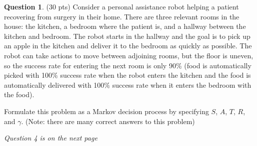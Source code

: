 \documentclass{article}
\theoremstyle{definition}
\newtheorem{question}[thm]{Question}
\begin{document}
\begin{question} (30 pts)
    Consider a personal assistance robot helping a patient recovering from surgery in their home. There are three relevant rooms in the house: the kitchen, a bedroom where the patient is, and a hallway between the kitchen and bedroom. The robot starts in the hallway and the goal is to pick up an apple in the kitchen and deliver it to the bedroom as quickly as possible. The robot can take actions to move between adjoining rooms, but the floor is uneven, so the success rate for entering the next room is only 90\% (food is automatically picked with 100\% success rate when the robot enters the kitchen and the food is automatically delivered with 100\% success rate when it enters the bedroom with the food).

    Formulate this problem as a Markov decision process by specifying $S$, $A$, $T$, $R$, and $\gamma$. (Note: there are many correct answers to this problem)
\end{question}

\emph{Question 4 is on the next page} \\
\end{document}
